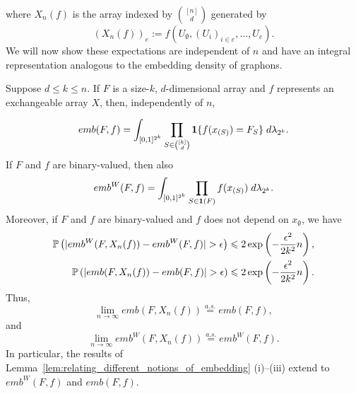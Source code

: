 \noindent where $X_n(f)$ is the array indexed by $\binom{[n]}{d}$ generated by
%
\[(X_n(f))_e := f(U_\emptyset, (U_i)_{i \in e},\ldots, U_e).\]
%
\noindent We will now show these expectations are independent of $n$ and
have an integral representation analogous to the embedding density of graphons.

\begin{lemma}
\label{lem:integral_representations_of_embedding_densities}
Suppose $d \leq k \leq n$. If $F$ is a size-$k$, $d$-dimensional array and
$f$ represents an exchangeable array $X$, then, independently of $n$,

\begin{equation}
    emb(F,f) = \int_{[0,1]^{2^k}}  \prod_{S \in \binom{[k]}{d}} \ind \{f(x_{(S)}) = F_S\} \; d\lambda_{2^k}.
\end{equation}
If $F$ and $f$ are binary-valued, then also
\begin{equation}
    emb^W(F,f) = \int_{[0,1]^{2^k}}  \prod_{S \in \ind(F)} f(x_{(S)}) \; d\lambda_{2^k}.
    \label{eqn:integral_formula_for_embedding_density_of_representing_function}
\end{equation}
%
\noindent Moreover, if $F$ and $f$ are binary-valued and $f$ does not depend on $x_\emptyset$, we have
%
\begin{align*}
    \P\left( |emb^W(F, X_n(f)) - emb^W(F, f)| > \epsilon \right) &  \leq 2 \exp \left(-\frac{\epsilon^2}{2k^2} n \right),\\
    \P\left( |emb(F, X_n(f)) - emb(F, f)| > \epsilon \right) & \leq 2 \exp \left(-\frac{\epsilon^2}{2k^2} n \right).
\end{align*}
%
\noindent Thus,
\[
\lim_{n \to \infty} emb(F, X_n(f)) \overset{a.s.}{=} emb(F,f),
\]
\noindent and
\[
    \lim_{n \to \infty} emb^W(F, X_n(f)) \overset{a.s.}{=} emb^W(F,f).
\]
\noindent In particular, the results of Lemma~\ref{lem:relating_different_notions_of_embedding} (i)--(iii) extend to $emb^W(F,f)$ and $emb(F,f)$.


\end{lemma}

